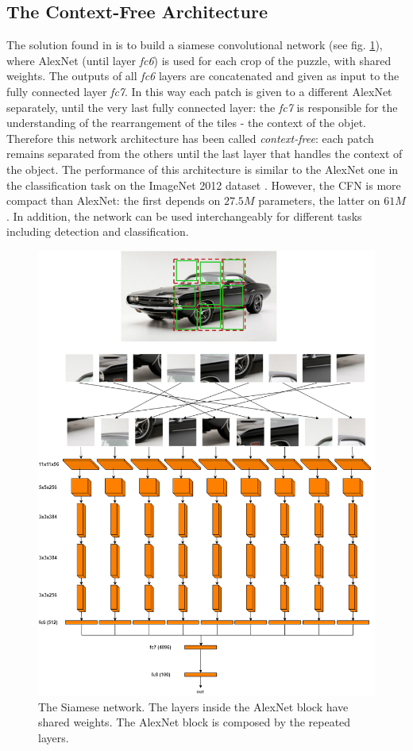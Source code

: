 \subsection{The Context-Free Architecture}\label{ss:CFN}
The solution found in \cite{Noroozi_2016} is to build a siamese convolutional network (see fig. \ref{fig:siamese_network}), where AlexNet (until layer \textit{fc6}) is used for each crop of the puzzle, with shared weights. The outputs of all \textit{fc6} layers are concatenated and given as input to the fully connected layer \textit{fc7}. In this way each patch is given to a different AlexNet separately, until the very last fully connected layer: the \textit{fc7} is responsible for the understanding of the rearrangement of the tiles - the context of the objet. Therefore this network architecture has been called \textit{context-free}: each patch remains separated from the others until the last layer that handles the context of the object. \newline
The performance of this architecture is similar to the AlexNet one in the classification task on the ImageNet 2012 dataset \cite{Imagenet_large_scale_hierarchical_image_database}. However, the CFN is more compact than AlexNet: the first depends on \(27.5M\) parameters, the latter on \(61M\). In addition, the network can be used interchangeably for different tasks including detection and classification.
\begin{figure}[!ht]
    \centering
    \includegraphics[scale=0.26]{images/Siamese_diagram.png}
    \caption{The Siamese network. The layers inside the AlexNet block have shared weights. The AlexNet block is composed by the repeated layers.}
    \label{fig:siamese_network}
\end{figure}

